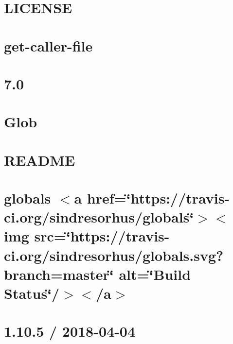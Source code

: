 \let\mypdfximage\pdfximage\def\pdfximage{\immediate\mypdfximage}\documentclass[twoside]{book}
\newcommand{\+}{\discretionary{\mbox{\scriptsize$\hookleftarrow$}}{}{}}
\begin{document}
\chapter{L\+I\+C\+E\+N\+SE}
\label{md_heap-visualizer_node_modules_get-caller-file__l_i_c_e_n_s_e}

\chapter{get-\/caller-\/file}
\label{md_heap-visualizer_node_modules_get-caller-file__r_e_a_d_m_e}

\chapter{7.0}
\label{md_heap-visualizer_node_modules_glob_changelog}

\chapter{Glob}
\label{md_heap-visualizer_node_modules_glob__r_e_a_d_m_e}

\chapter{R\+E\+A\+D\+ME}
\label{md_heap-visualizer_node_modules_glob-parent__r_e_a_d_m_e}

\chapter{globals $<$a href=\char`\"{}https\+://travis-\/ci.\+org/sindresorhus/globals\char`\"{}$>$$<$img src=\char`\"{}https\+://travis-\/ci.\+org/sindresorhus/globals.\+svg?branch=master\char`\"{} alt=\char`\"{}\+Build Status\char`\"{}/$>$$<$/a$>$}
\label{md_heap-visualizer_node_modules_globals_readme}

\chapter{1.10.5 / 2018-\/04-\/04}
\label{md_heap-visualizer_node_modules_growl__history}

\end{document}
